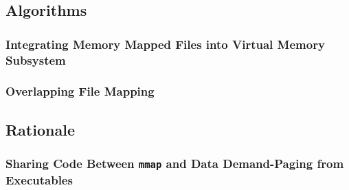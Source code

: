 \documentclass{article}
\renewcommand{\_}{\char`_}
\begin{document}
\subsection{Algorithms}

\subsubsection{Integrating Memory Mapped Files into Virtual Memory Subsystem}

\subsubsection{Overlapping File Mapping}

\subsection{Rationale}

\subsubsection{Sharing Code Between \texttt{mmap} and Data Demand-Paging from Executables}
\end{document}
